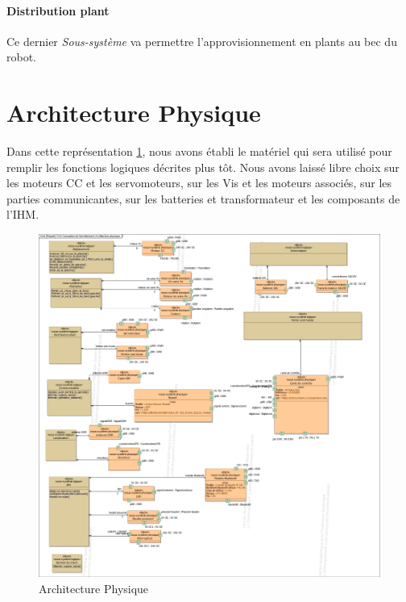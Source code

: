 \paragraph*{Distribution plant} 
Ce dernier \emph{Sous-système} va permettre l'approvisionnement en plants au bec du robot.  

\section{Architecture Physique}
Dans cette représentation \ref{fig:architecturePhysique}, nous avons établi le matériel qui sera utilisé pour remplir les fonctions logiques décrites plus tôt. Nous avons laissé libre choix sur les moteurs CC et les servomoteurs, sur les Vis et les moteurs associés, sur les parties communicantes, sur les batteries et transformateur et les composants de l'IHM. 
\begin{figure}[!ht]
\centering
\includegraphics[width = \textwidth]{./III/images/SysML_Block_Definition_Diagram_3-CA_Conception_de_l_architecture_Architecture_physique.pdf}
\caption{Architecture Physique}\label{fig:architecturePhysique}
\end{figure}

